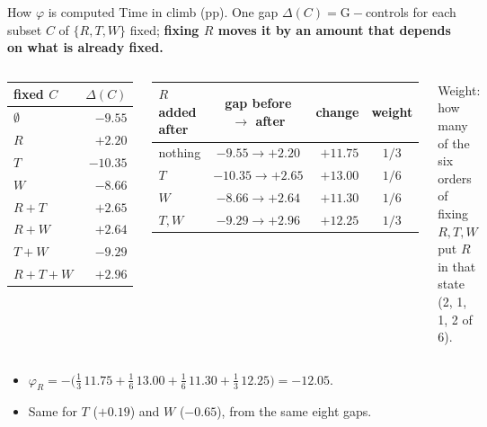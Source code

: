 \documentclass[11pt,aspectratio=169]{beamer}
\newcommand{\G}{\mathrm{G}}
\begin{document}
\begin{frame}[label=app-phi]{How $\varphi$ is computed}
\vspace{-3mm}
\noindent\small Time in climb (pp). One gap $\Delta(C)=\G-{}$controls for each subset $C$ of $\{R,T,W\}$ fixed; \textbf{fixing $R$ moves it by an amount that depends on what is already fixed.}
\begin{columns}[T,onlytextwidth]
\begin{center}\footnotesize
\renewcommand{\arraystretch}{1.0}
\begin{tabular}{@{}l r@{}}
\toprule
fixed $C$ & $\Delta(C)$ \\
\midrule
$\emptyset$ & $-9.55$ \\
$R$ & $+2.20$ \\
$T$ & $-10.35$ \\
$W$ & $-8.66$ \\
$R{+}T$ & $+2.65$ \\
$R{+}W$ & $+2.64$ \\
$T{+}W$ & $-9.29$ \\
$R{+}T{+}W$ & $+2.96$ \\
\bottomrule
\end{tabular}
\end{center}
\begin{center}\footnotesize
\renewcommand{\arraystretch}{1.0}
\begin{tabular}{@{}l c r c@{}}
\toprule
$R$ added after & gap before $\to$ after & change & weight \\
\midrule
nothing & $-9.55\to+2.20$ & $+11.75$ & $1/3$ \\
$T$ & $-10.35\to+2.65$ & $+13.00$ & $1/6$ \\
$W$ & $-8.66\to+2.64$ & $+11.30$ & $1/6$ \\
$T,W$ & $-9.29\to+2.96$ & $+12.25$ & $1/3$ \\
\bottomrule
\end{tabular}
\end{center}
{\footnotesize Weight: how many of the six orders of fixing $R,T,W$ put $R$ in that state (2, 1, 1, 2 of 6).}
\end{columns}
\begin{itemize}\small
  \item $\varphi_R=-\big(\tfrac13\,11.75+\tfrac16\,13.00+\tfrac16\,11.30+\tfrac13\,12.25\big)=-12.05$.
  \item Same for $T$ ($+0.19$) and $W$ ($-0.65$), from the same eight gaps.
\end{itemize}
\end{frame}
\end{document}
